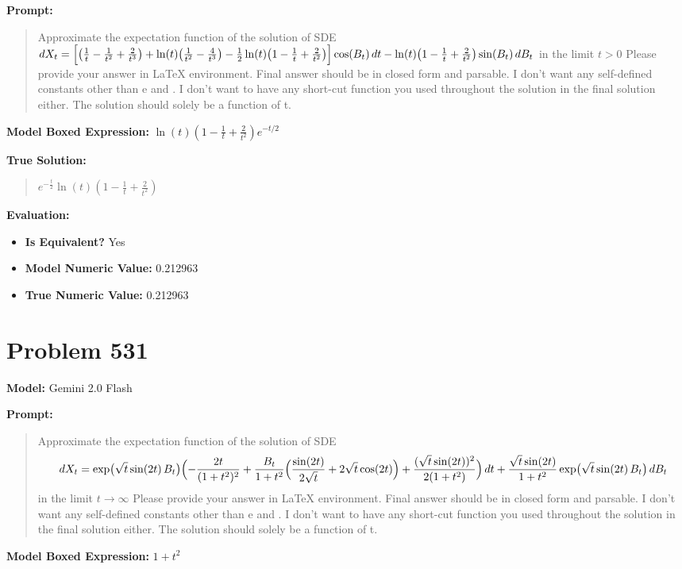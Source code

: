 \documentclass{article}
\begin{document}
\textbf{Prompt:}
\begin{quote}
Approximate the expectation function of the solution of SDE $dX_t = \Bigl[\bigl(\frac1t-\frac1{t^2}+\frac2{t^3}\bigr)+\ln(t)\bigl(\frac1{t^2}-\frac4{t^3}\bigr)-\tfrac12\ln(t)\bigl(1-\frac1t+\frac2{t^2}\bigr)\Bigr]\cos(B_t)\,dt - \ln(t)\bigl(1-\frac1t+\frac2{t^2}\bigr)\sin(B_t)\,dB_t$ in the limit $ t > 0$ Please provide your answer in LaTeX \boxed{} environment. Final answer should be in closed form and parsable. I don't want any self-defined constants other than e and \pi. I don't want to have any short-cut function you used throughout the solution in the final solution either. The solution should solely be a function of t.
\end{quote}
\textbf{Model Boxed Expression:} $\ln(t)\left(1-\frac{1}{t}+\frac{2}{t^2}\right)e^{-t/2}$

\textbf{True Solution:}
\begin{quote}
$e^{-\frac{t}{2}} \ln(t) (1 - \frac{1}{t} + \frac{2}{t^2})$
\end{quote}

\textbf{Evaluation:}
\begin{itemize}
\item \textbf{Is Equivalent?} Yes
\item \textbf{Model Numeric Value:} 0.212963
\item \textbf{True Numeric Value:} 0.212963
\end{itemize}
\vspace{1cm}
\section*{Problem 531}
\textbf{Model:} Gemini 2.0 Flash

\textbf{Prompt:}
\begin{quote}
Approximate the expectation function of the solution of SDE $$dX_t=\exp\bigl(\sqrt{t}\sin(2t)\,B_t\bigr)\Bigl(-\frac{2t}{(1+t^2)^2}+\frac{B_t}{1+t^2}\Bigl(\frac{\sin(2t)}{2\sqrt{t}}+2\sqrt{t}\cos(2t)\Bigr)+\frac{(\sqrt{t}\sin(2t))^2}{2(1+t^2)}\Bigr)\,dt+\frac{\sqrt{t}\sin(2t)}{1+t^2}\exp\bigl(\sqrt{t}\sin(2t)\,B_t\bigr)\,dB_t$$ in the limit $t \to \infty$ Please provide your answer in LaTeX \boxed{} environment. Final answer should be in closed form and parsable. I don't want any self-defined constants other than e and \pi. I don't want to have any short-cut function you used throughout the solution in the final solution either. The solution should solely be a function of t.
\end{quote}
\textbf{Model Boxed Expression:} $1+t^2$
\end{document}
